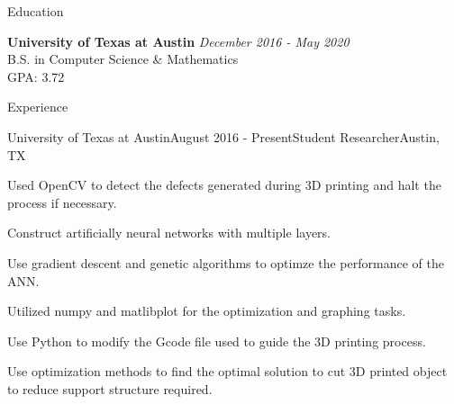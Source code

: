 \documentclass{resume} %
\begin{document}

\begin{rSection}{Education}

{\bf University of Texas at Austin} \hfill {\em December 2016 - May 2020} \\ 
B.S. in Computer Science \& Mathematics \\
GPA: 3.72

\end{rSection}


\begin{rSection}{Experience}

\begin{rSubsection}{University of Texas at Austin}{August 2016 - Present}{Student Researcher}{Austin, TX}
\item Used OpenCV to detect the defects generated during 3D printing and halt the process if necessary.
\item Construct artificially neural networks with multiple layers.
\item Use gradient descent and genetic algorithms to optimze the performance of the ANN.
\item Utilized numpy and matlibplot for the optimization and graphing tasks.
\item Use Python to modify the Gcode file used to guide the 3D printing process.
\item Use optimization methods to find the optimal solution to cut 3D printed object to reduce support structure required.

\end{rSubsection}

\end{rSection}
\end{document}
